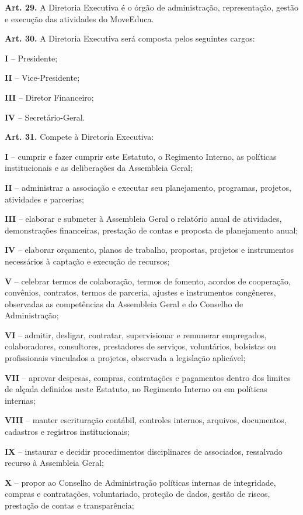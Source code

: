\documentclass[11pt,a4paper]{article}
\begin{document}
\textbf{Art. 29.} A Diretoria Executiva é o órgão de administração, representação, gestão e execução das atividades do MoveEduca.

\textbf{Art. 30.} A Diretoria Executiva será composta pelos seguintes cargos:

\textbf{I} -- Presidente;

\textbf{II} -- Vice-Presidente;

\textbf{III} -- Diretor Financeiro;

\textbf{IV} -- Secretário-Geral.

\textbf{Art. 31.} Compete à Diretoria Executiva:

\textbf{I} -- cumprir e fazer cumprir este Estatuto, o Regimento Interno, as políticas institucionais e as deliberações da Assembleia Geral;

\textbf{II} -- administrar a associação e executar seu planejamento, programas, projetos, atividades e parcerias;

\textbf{III} -- elaborar e submeter à Assembleia Geral o relatório anual de atividades, demonstrações financeiras, prestação de contas e proposta de planejamento anual;

\textbf{IV} -- elaborar orçamento, planos de trabalho, propostas, projetos e instrumentos necessários à captação e execução de recursos;

\textbf{V} -- celebrar termos de colaboração, termos de fomento, acordos de cooperação, convênios, contratos, termos de parceria, ajustes e instrumentos congêneres, observadas as competências da Assembleia Geral e do Conselho de Administração;

\textbf{VI} -- admitir, desligar, contratar, supervisionar e remunerar empregados, colaboradores, consultores, prestadores de serviços, voluntários, bolsistas ou profissionais vinculados a projetos, observada a legislação aplicável;

\textbf{VII} -- aprovar despesas, compras, contratações e pagamentos dentro dos limites de alçada definidos neste Estatuto, no Regimento Interno ou em políticas internas;

\textbf{VIII} -- manter escrituração contábil, controles internos, arquivos, documentos, cadastros e registros institucionais;

\textbf{IX} -- instaurar e decidir procedimentos disciplinares de associados, ressalvado recurso à Assembleia Geral;

\textbf{X} -- propor ao Conselho de Administração políticas internas de integridade, compras e contratações, voluntariado, proteção de dados, gestão de riscos, prestação de contas e transparência;
\end{document}
